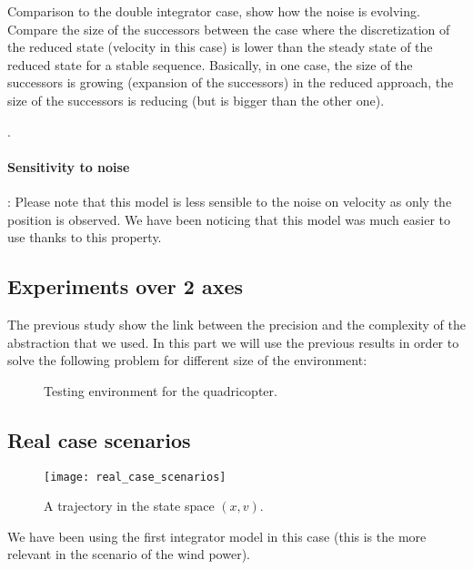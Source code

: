 Comparison to the double integrator case, show how the noise is evolving. Compare the size of the successors between the case where the discretization of the reduced state (velocity in this case) is lower than the steady state of the reduced state for a stable sequence. Basically, in one case, the size of the successors is growing (expansion of the successors) in the reduced approach, the size of the successors is reducing (but is bigger than the other one).


.

\paragraph{Sensitivity to noise}:
Please note that this model is less sensible to the noise on velocity as only the position is observed.
We have been noticing that this model was much easier to use thanks to this property.

\subsection{Experiments over 2 axes}

The previous study show the link between the precision and the complexity of the abstraction that we used.
In this part we will use the previous results in order to solve the following problem for different size of the environment:

\begin{figure}
	\center
	
	\caption{Testing environment for the quadricopter.}
	\label{fig:environment}
\end{figure}



\subsection{Real case scenarios}

\begin{figure}[!ht]
  \centering
  \texttt{[image: real\_case\_scenarios]}
  \caption{A trajectory in the state space $(x,v)$.}
\end{figure}

We have been using the first integrator model in this case (this is the more relevant in the scenario of the wind power).

